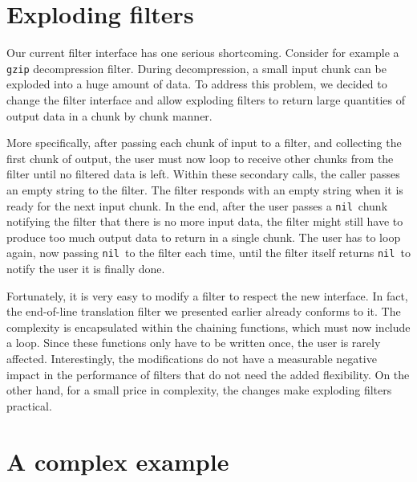 \documentclass[10pt]{article}
\newcommand{\nil}{\texttt{nil}}
\begin{document}
\section{Exploding filters}

Our current filter interface has one serious shortcoming.
Consider for example a \texttt{gzip} decompression filter.
During decompression, a small input chunk can be exploded
into a huge amount of data. To address this problem, we
decided to change the filter interface and allow exploding
filters to return large quantities of output data in a chunk
by chunk manner. 

More specifically, after passing each chunk of input to
a filter, and collecting the first chunk of output, the
user must now loop to receive other chunks from the filter until no
filtered data is left. Within these secondary calls, the
caller passes an empty string to the filter. The filter
responds with an empty string when it is ready for the next
input chunk. In the end, after the user passes a
\nil\ chunk notifying the filter that there is no
more input data, the filter might still have to produce too
much output data to return in a single chunk. The user has
to loop again, now passing \nil\ to the filter each time,
until the filter itself returns \nil\ to notify the
user it is finally done.

Fortunately, it is very easy to modify a filter to respect
the new interface. In fact, the end-of-line translation
filter we presented earlier already conforms to it.  The
complexity is encapsulated within the chaining functions,
which must now include a loop. Since these functions only
have to be written once, the user is rarely affected.
Interestingly, the modifications do not have a measurable
negative impact in the performance of filters that do
not need the added flexibility. On the other hand, for a
small price in complexity, the changes make exploding
filters practical.

\section{A complex example}
\end{document}
